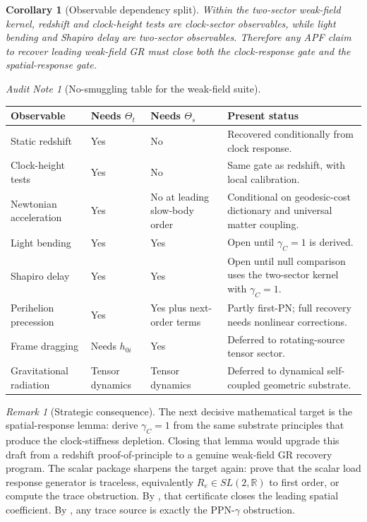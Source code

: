 \documentclass[11pt]{article}
\newtheorem{corollary}[theorem]{Corollary}
\theoremstyle{remark}
\newtheorem{remark}[theorem]{Remark}
\newtheorem{audit}[theorem]{Audit Note}
\begin{document}
\begin{corollary}[Observable dependency split]
\label{cor:observable-dependency-split}
Within the two-sector weak-field kernel, redshift and clock-height tests are clock-sector observables, while light bending and Shapiro delay are two-sector observables.  Therefore any APF claim to recover leading weak-field GR must close both the clock-response gate and the spatial-response gate.
\end{corollary}

\begin{audit}[No-smuggling table for the weak-field suite]
\begin{longtable}{p{}p{}p{}p{}}
\toprule
Observable & Needs \(\Theta_t\) & Needs \(\Theta_s\) & Present status \\
\midrule
Static redshift & Yes & No & Recovered conditionally from clock response. \\
Clock-height tests & Yes & No & Same gate as redshift, with local calibration. \\
Newtonian acceleration & Yes & No at leading slow-body order & Conditional on geodesic-cost dictionary and universal matter coupling. \\
Light bending & Yes & Yes & Open until \(\gamma_C=1\) is derived. \\
Shapiro delay & Yes & Yes & Open until null comparison uses the two-sector kernel with \(\gamma_C=1\). \\
Perihelion precession & Yes & Yes plus next-order terms & Partly first-PN; full recovery needs nonlinear corrections. \\
Frame dragging & Needs \(h_{0i}\) & Yes & Deferred to rotating-source tensor sector. \\
Gravitational radiation & Tensor dynamics & Tensor dynamics & Deferred to dynamical self-coupled geometric substrate. \\
\bottomrule
\end{longtable}
\end{audit}

\begin{remark}[Strategic consequence]
The next decisive mathematical target is the spatial-response lemma: derive \(\gamma_C=1\) from the same substrate principles that produce the clock-stiffness depletion.  Closing that lemma would upgrade this draft from a redshift proof-of-principle to a genuine weak-field GR recovery program.  The scalar package sharpens the target again: prove that the scalar load response generator is traceless, equivalently \(R_e\in SL(2,\mathbb R)\) to first order, or compute the trace obstruction.  By , that certificate closes the leading spatial coefficient.  By , any trace source is exactly the PPN-\(\gamma\) obstruction.
\end{remark}
\end{document}
